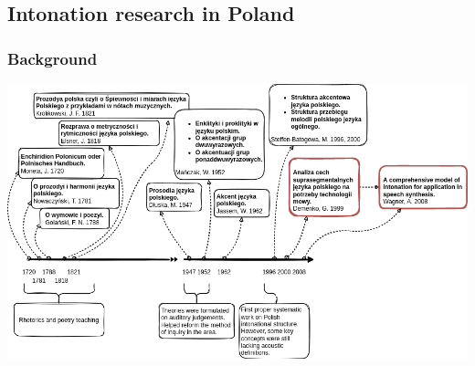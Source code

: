 \documentclass[a4paper,9pt]{beamer}
\theoremstyle{mytheoremstyle}
\begin{document}
\subsection{Intonation research in Poland}
\begin{frame}
\frametitle{Background}
\includegraphics[width=\textwidth]{res/intonation_background_pl.png}
\end{frame}
\end{document}
